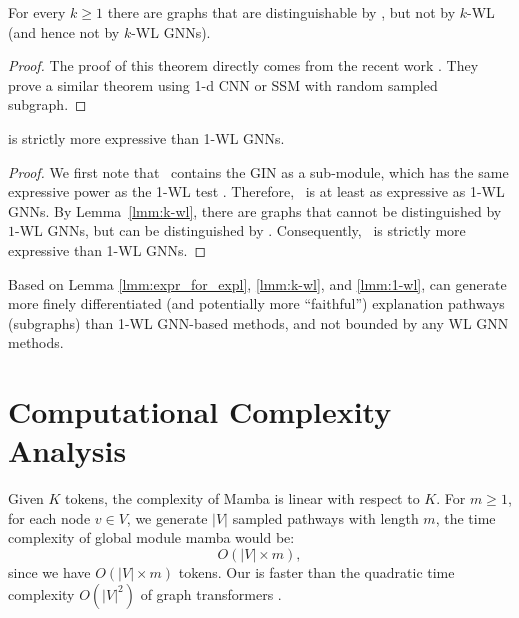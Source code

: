 \begin{lemma}
\label{lmm:k-wl}
For every $k\ge 1$ there are graphs that are distinguishable
    by \classifier, but not
    by $k$-WL (and hence not by $k$-WL GNNs).
\end{lemma}

\begin{proof}
The proof of this theorem directly comes from the recent work \cite{crawl, graphmamba_kdd}. They prove a similar
theorem using 1-d CNN \cite{crawl} or SSM \cite{graphmamba_kdd} with random sampled subgraph.
\end{proof}

\begin{lemma}
\label{lmm:1-wl}
\classifier is strictly more expressive than 1-WL GNNs.
\end{lemma}

\begin{proof}
We first note that \classifier\ contains the GIN as a sub-module, which has the same expressive power as the 1-WL test \cite{GIN}.
Therefore, \classifier\ is at least as expressive as 1-WL GNNs.
By Lemma~\ref{lmm:k-wl}, there are graphs that cannot be
distinguished by $1$-WL GNNs, but can be distinguished by
\classifier. Consequently, \classifier\ is strictly more expressive than 1-WL
GNNs.
\end{proof}

\begin{theorem}
\label{thm}
Based on Lemma \ref{lmm:expr_for_expl}, \ref{lmm:k-wl}, and \ref{lmm:1-wl}, \method can generate more finely differentiated (and potentially 
more ``faithful'') explanation pathways (subgraphs) than 1-WL GNN-based methods, and not bounded by any WL GNN methods.
\end{theorem}

\section{Computational Complexity Analysis}
\label{app:complexity}
Given \( K \) tokens, the complexity of Mamba \cite{Mamba} is  linear with respect to \( K \). 
For \( m \geq 1 \), for each node \( v \in V \), we generate \( |V| \) sampled pathways with length \( m \), the time complexity of global module mamba
would be: 
\[ O(|V| \times m), \]
since we have \( O(|V| \times m) \) tokens. 
Our \classifier is faster than the quadratic time complexity \( O(|V| ^2) \) of graph transformers \cite{GPS}.

